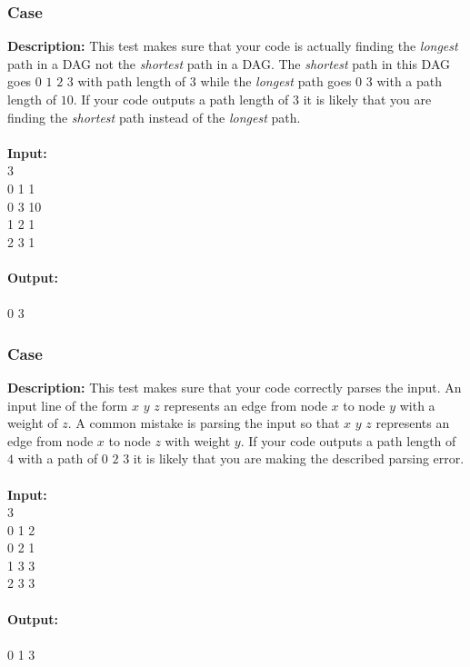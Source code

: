 \documentclass{article}
\newcommand{\code}[1]{{\fontfamily{pcr}\selectfont #1}}
\begin{document}
\subsubsection*{Case }
\hline \vspace{5}
\textbf{Description:} This test makes sure that your code is actually finding the \emph{longest} path in a DAG not the \emph{shortest} path in a DAG. The \emph{shortest} path in this DAG goes $0$ $1$ $2$ $3$ with path length of $3$ while the \emph{longest} path goes $0$ $3$ with a path length of $10$. If your code outputs a path length of $3$ it is likely that you are finding the \emph{shortest} path instead of the \emph{longest} path.\\ \\
\noindent \textbf{Input:}\\
\code{0 3\\0 1 1\\0 3 10\\1 2 1\\2 3 1}\\ \\
\noindent \textbf{Output:}\\
\code{10\\0 3}
\pagebreak

\subsubsection*{Case }
\hline \vspace{5}
\textbf{Description:} This test makes sure that your code correctly parses the input. An input line of the form $x$ $y$ $z$ represents an edge from node $x$ to node $y$ with a weight of $z$. A common mistake is parsing the input so that $x$ $y$ $z$ represents an edge from node $x$ to node $z$ with weight $y$. If your code outputs a path length of $4$ with a path of $0$ $2$ $3$ it is likely that you are making the described parsing error.\\ \\
\noindent \textbf{Input:}\\
\code{0 3\\0 1 2\\0 2 1\\1 3 3\\2 3 3}\\ \\
\noindent \textbf{Output:}\\
\code{5\\0 1 3}
\end{document}
